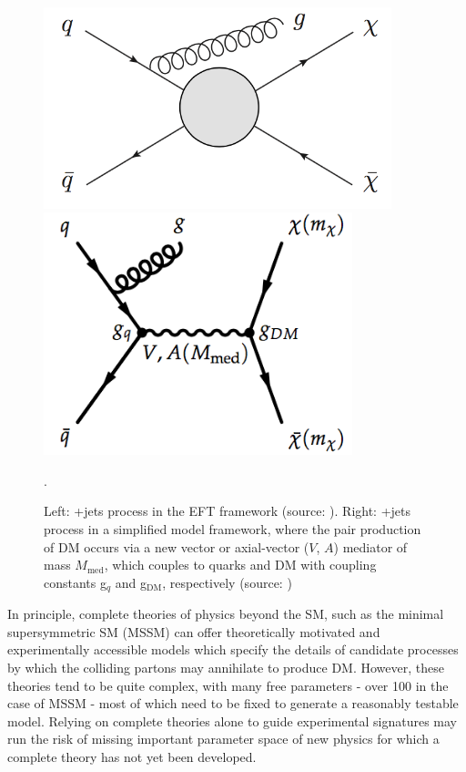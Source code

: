 \begin{figure}[h]
	\centering
	\begin{minipage}[b]{0.45\textwidth}
	\includegraphics[width=0.9\textwidth]{Figures/1/EFT_Signature.png}
	\end{minipage}
	\begin{minipage}[b]{0.45\textwidth}
	\includegraphics[width=0.8\textwidth]{Figures/1/simplified_model.png}
	\end{minipage}
	\caption[]{Left: \met+jets process in the EFT framework (source: \cite{beyond_eft}). Right: \met+jets process in a simplified model framework, where the pair production of DM occurs via a new vector or axial-vector ($V$, $A$) mediator of mass $M_\text{med}$, which couples to quarks and DM with coupling constants g$_q$ and g$_\text{DM}$, respectively (source: \cite{dm_forum})}.
	\label{fig:eft_simplified_model}
\end{figure}

In principle, complete theories of physics beyond the SM, such as the minimal supersymmetric SM (MSSM) \cite{mssm} can offer theoretically motivated and experimentally accessible models which specify the details of candidate processes by which the colliding partons may annihilate to produce DM. However, these theories tend to be quite complex, with many free parameters - over 100 in the case of MSSM \cite{DM_colliders} - most of which need to be fixed to generate a reasonably testable model. Relying on complete theories alone to guide experimental signatures may run the risk of missing important parameter space of new physics for which a complete theory has not yet been developed. 

